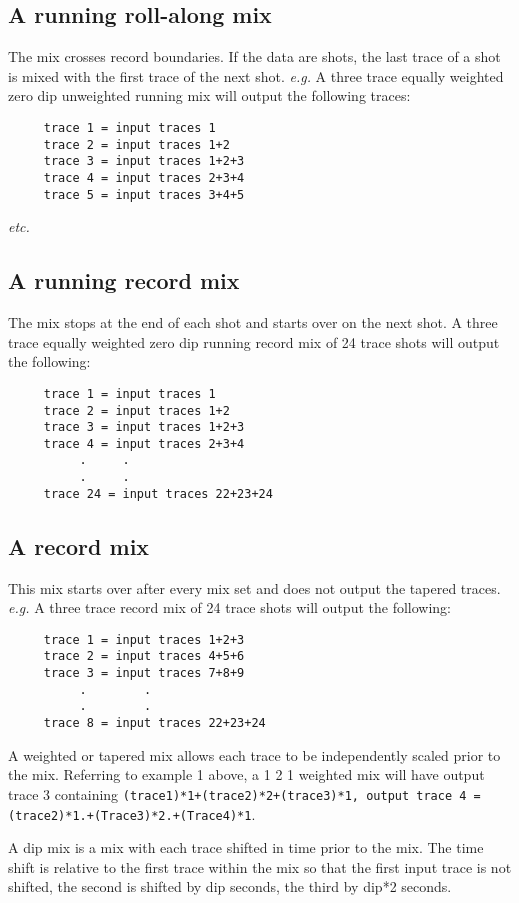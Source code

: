 \subsection{A running roll-along mix}
The mix crosses record boundaries.  If the data are \glspl{shot}, the last
trace of a \gls{shot} is mixed with the first trace of the next \gls{shot}.
\textit{e.g.} A three trace equally weighted zero dip unweighted running mix
will output the following traces:
\begin{verbatim}
     trace 1 = input traces 1
     trace 2 = input traces 1+2
     trace 3 = input traces 1+2+3
     trace 4 = input traces 2+3+4
     trace 5 = input traces 3+4+5
\end{verbatim}
\textit{etc.}

\subsection{A running record mix}
The mix stops at the end of each \gls{shot} and starts over on the next
\gls{shot}.  A three trace equally weighted zero dip running record mix of 24
trace \glspl{shot} will output the following:
\begin{verbatim}
     trace 1 = input traces 1
     trace 2 = input traces 1+2
     trace 3 = input traces 1+2+3
     trace 4 = input traces 2+3+4
          .     .
          .     .
     trace 24 = input traces 22+23+24
\end{verbatim}

\subsection{A record mix}
This mix starts over after every mix set and does not output the tapered traces.  \textit{e.g.} A three trace record mix of 24 trace \glspl{shot} will output the following:
\begin{verbatim}
     trace 1 = input traces 1+2+3
     trace 2 = input traces 4+5+6
     trace 3 = input traces 7+8+9
          .        .
          .        .
     trace 8 = input traces 22+23+24
\end{verbatim}


A weighted or tapered mix allows each trace to be independently scaled
prior to the mix.  Referring to example 1 above, a 1 2 1 weighted mix
will have output trace 3 containing \texttt{(trace1)*1+(trace2)*2+(trace3)*1,
output trace 4 = (trace2)*1.+(Trace3)*2.+(Trace4)*1}.

A dip mix is a mix with each trace shifted in time prior to the mix.
The time shift is relative to the first trace within the mix so that the
first input trace is not shifted, the second is shifted by dip seconds,
the third by dip*2 seconds.

